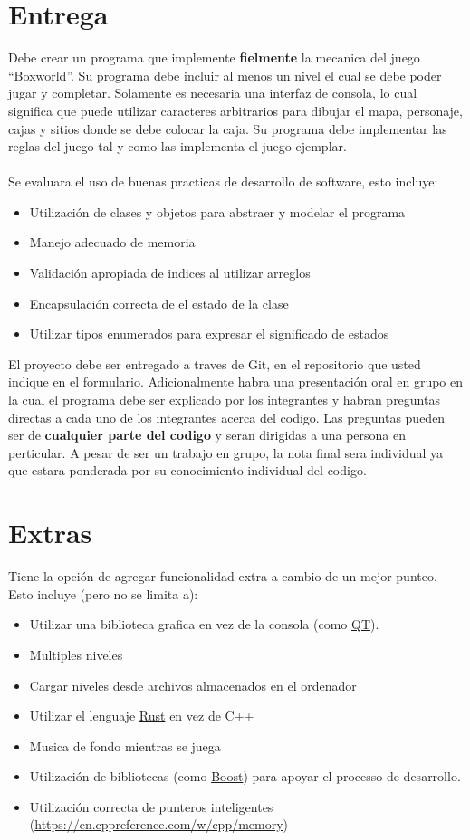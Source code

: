 \documentclass{article}
\begin{document}
\section*{Entrega}
Debe crear un programa que implemente {\bf fielmente} la mecanica del juego ``Boxworld''.
Su programa debe incluir al menos un nivel el cual se debe poder jugar y completar.
Solamente es necesaria una interfaz de consola, lo cual significa que puede utilizar
caracteres arbitrarios para dibujar el mapa, personaje, cajas y sitios donde se debe
colocar la caja. Su programa debe implementar las reglas del juego tal y como las
implementa el juego ejemplar.
\\\\
Se evaluara el uso de buenas practicas de desarrollo de software, esto incluye:
\begin{itemize}
        \item{Utilizaci\'on de clases y objetos para abstraer y modelar el programa}
        \item{Manejo adecuado de memoria}
        \item{Validaci\'on apropiada de indices al utilizar arreglos}
        \item{Encapsulaci\'on correcta de el estado de la clase}
        \item{Utilizar tipos enumerados para expresar el significado de estados}
\end{itemize}
El proyecto debe ser entregado a traves de Git, en el repositorio que usted
indique en el formulario. Adicionalmente habra una presentaci\'on oral en grupo
en la cual el programa debe ser explicado por los integrantes y habran preguntas
directas a cada uno de los integrantes acerca del codigo. Las preguntas pueden
ser de {\bf cualquier parte del codigo} y seran dirigidas a una persona en
perticular. A pesar de ser un trabajo en grupo, la nota final sera individual
ya que estara ponderada por su conocimiento individual del codigo.
\section*{Extras}
Tiene la opci\'on de agregar funcionalidad extra a cambio de un mejor punteo.
Esto incluye (pero no se limita a):
\begin{itemize}
        \item{Utilizar una biblioteca grafica en vez de la consola (como \href{https://www.qt.io/}{QT}).}
        \item{Multiples niveles}
        \item{Cargar niveles desde archivos almacenados en el ordenador}
        \item{Utilizar el lenguaje \href{https://www.rust-lang.org/}{Rust} en vez de C++}
        \item{Musica de fondo mientras se juega}
        \item{Utilizaci\'on de bibliotecas (como \href{https://www.boost.org/}{Boost})
        para apoyar el processo de desarrollo.}
        \item{Utilizaci\'on correcta de punteros inteligentes (\url{https://en.cppreference.com/w/cpp/memory})}
\end{itemize}
\end{document}

